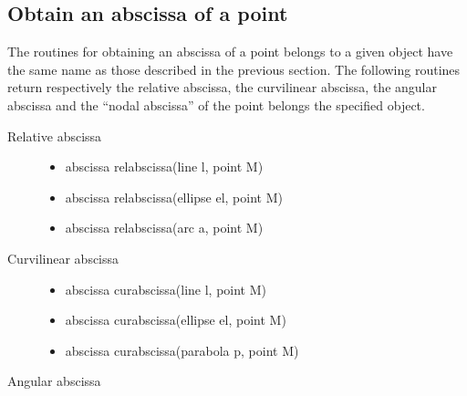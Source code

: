 \documentclass[pdftex]{article}
\begin{document}
\subsection{Obtain an abscissa of a point}
The routines for obtaining an abscissa of a point belongs to a given
object have the same name as those described in the previous section.
The following routines return respectively the relative abscissa, the
curvilinear abscissa, the angular abscissa and the ``nodal abscissa''
of the point  belongs the specified object.
\begin{description}
\item[Relative abscissa]\hspace*{0mm}
  \begin{itemize}
  \item {}
    \begin{Vcolor}
      abscissa relabscissa(line l, point M)
    \end{Vcolor}
  \item {}
    \begin{Vcolor}
      abscissa relabscissa(ellipse el, point M)
    \end{Vcolor}
  \item {}
    \begin{Vcolor}
      abscissa relabscissa(arc a, point M)
    \end{Vcolor}
  \end{itemize}
\item[Curvilinear abscissa]\hspace*{0mm}
  \begin{itemize}
  \item {}
    \begin{Vcolor}
      abscissa curabscissa(line l, point M)
    \end{Vcolor}
  \item {}
    \begin{Vcolor}
      abscissa curabscissa(ellipse el, point M)
    \end{Vcolor}
  \item {}
    \begin{Vcolor}
      abscissa curabscissa(parabola p, point M)
    \end{Vcolor}
  \end{itemize}
\item [Angular abscissa]\hspace*{0mm}

\end{description}
\end{document}
